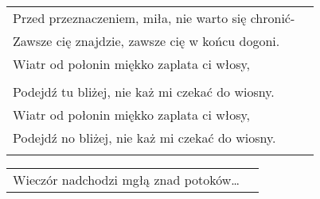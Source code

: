 \documentclass[a5paper]{article}
\begin{document}
\noindent
\begin{tabular}{@{}p{8.50cm}p{3cm}@{}}
Przed przeznaczeniem, miła, nie warto się chronić- \\
Zawsze cię znajdzie, zawsze cię w końcu dogoni. \\
Wiatr od połonin miękko zaplata ci włosy, \\ \\

Podejdź tu bliżej, nie każ mi czekać do wiosny. \\ 
Wiatr od połonin miękko zaplata ci włosy, \\
Podejdź no bliżej, nie każ mi czekać do wiosny. \\ \\
\end{tabular}

\noindent
\begin{tabular}{@{}p{7.50cm}p{3cm}@{}}
Wieczór nadchodzi mgłą znad potoków… \\
\end{tabular}
\end{document}
